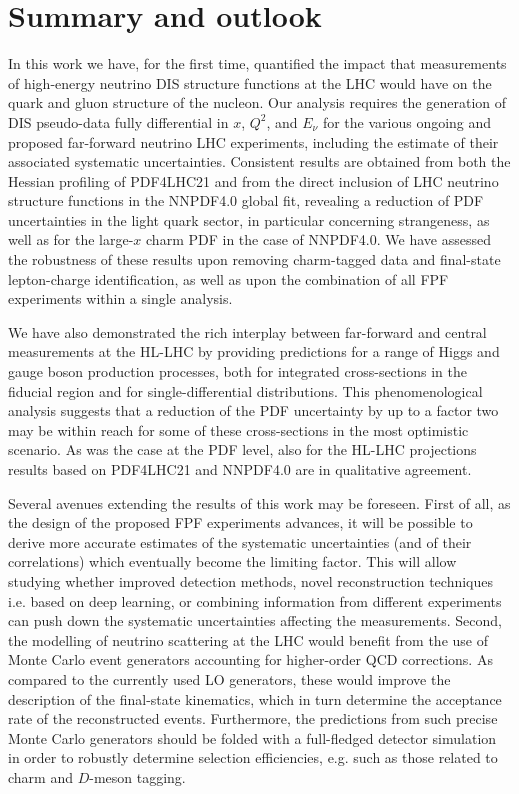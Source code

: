 \section{Summary and outlook}
\label{sec:summary}

In this work we have, for the first time,
quantified the impact that measurements of high-energy
neutrino DIS structure functions at the LHC would have on the quark
and gluon structure of the nucleon.
%
Our analysis requires the generation of
DIS pseudo-data fully differential in $x$, $Q^2$, and $E_\nu$
for the various ongoing and proposed far-forward
neutrino LHC experiments, including the estimate
of their associated systematic uncertainties.
%
Consistent results are obtained from both the Hessian profiling
of PDF4LHC21 and from the direct inclusion of LHC neutrino
structure functions in the NNPDF4.0 global
fit, revealing a reduction of PDF uncertainties in the
light quark sector, in particular concerning strangeness, as well
as for the large-$x$ charm PDF in the case of NNPDF4.0.
%
We have assessed the  robustness of these results upon
removing charm-tagged data and final-state lepton-charge
identification, as well as upon the combination
of all FPF experiments within a single analysis.

We have also demonstrated the rich interplay between
far-forward and central measurements
at the HL-LHC by providing predictions
for a range of Higgs and gauge boson production processes,
both for integrated cross-sections in the fiducial region and for
single-differential distributions.
%
This phenomenological analysis suggests that a reduction
of the  PDF uncertainty by up to a factor two
may be within reach for some of these cross-sections
in the most optimistic scenario.
%
As was the case at the PDF level, also for 
the HL-LHC projections results based on  PDF4LHC21 and NNPDF4.0
are in qualitative agreement.

Several avenues extending the results of this work may be foreseen.
%
First of all, as the design of the proposed FPF experiments
 advances, it will be possible to derive
 more accurate estimates of the systematic
uncertainties (and of their correlations) 
which eventually become the limiting factor.
%
This will allow studying whether  improved detection methods,
novel reconstruction techniques i.e. based
on deep learning, or combining information from different
experiments can  push down the systematic uncertainties
affecting the measurements.
%
Second, the modelling of neutrino scattering at the LHC would benefit from
the use of Monte Carlo event generators accounting
for higher-order QCD corrections.
%
As compared to the currently used LO generators,
these would improve the description of the final-state
kinematics, which in turn determine the acceptance rate
of the reconstructed events.
%
Furthermore, the predictions from such precise Monte Carlo generators
should be folded with a full-fledged detector simulation
in order to robustly determine selection efficiencies, e.g.
such as those related to charm and $D$-meson tagging.

